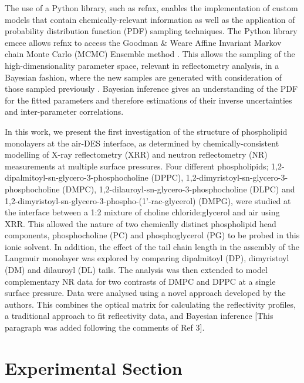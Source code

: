 \documentclass[amsmath,amssymb,twocolumn,superscriptaddress]{revtex4-1}
\begin{document}
The use of a Python library, such as refnx, enables the implementation of custom models that contain chemically-relevant information as well as the application of probability distribution function (PDF) sampling techniques.
The Python library emcee \cite{foreman-mackey_emcee_2013} allows refnx to access the Goodman \& Weare Affine Invariant Markov chain Monte Carlo (MCMC) Ensemble method \cite{goodman_ensemble_2010}.
This allows the sampling of the high-dimensionality parameter space, relevant in reflectometry analysis, in a Bayesian fashion, where the new samples are generated with consideration of those sampled previously \cite{sivia_data_2006}.
Bayesian inference gives an understanding of the PDF for the fitted parameters and therefore estimations of their inverse uncertainties and inter-parameter correlations.

In this work, we present the first investigation of the structure of phospholipid monolayers at the air-DES interface, as determined by chemically-consistent modelling of X-ray reflectometry (XRR) and neutron reflectometry (NR) measurements at multiple surface pressures.
Four different phospholipids; 1,2-dipalmitoyl-sn-glycero-3-phosphocholine (DPPC), 1,2-dimyristoyl-sn-glycero-3-phosphocholine (DMPC),  1,2-dilauroyl-sn-glycero-3-phosphocholine (DLPC) and 1,2-dimyristoyl-sn-glycero-3-phospho-(1'-rac-glycerol) (DMPG), were studied at the interface between a 1:2 mixture of choline chloride:glycerol and air using XRR.
This allowed the nature of two chemically distinct phospholipid head components, phosphocholine (PC) and phosphoglycerol (PG) to be probed in this ionic solvent.
In addition, the effect of the tail chain length in the assembly of the Langmuir monolayer was explored by comparing dipalmitoyl (DP), dimyristoyl (DM) and dilauroyl (DL) tails.
The analysis was then extended to model complementary NR data for two contrasts of DMPC and DPPC at a single surface pressure. Data were analysed using a novel approach developed by the authors.
This combines the optical matrix for calculating the reflectivity profiles, a traditional approach to fit reflectivity data, and Bayesian inference \cite{abeles_sur_1948,parratt_surface_1954} [This paragraph was added following the comments of Ref 3].

\section{Experimental Section}
%
\end{document}
